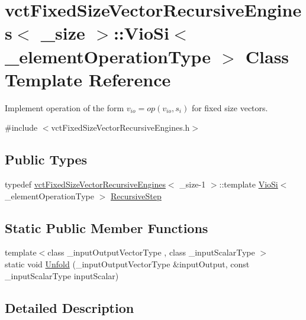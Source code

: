 \hypertarget{classvct_fixed_size_vector_recursive_engines_1_1_vio_si}{}\section{vct\+Fixed\+Size\+Vector\+Recursive\+Engines$<$ \+\_\+size $>$\+:\+:Vio\+Si$<$ \+\_\+element\+Operation\+Type $>$ Class Template Reference}
\label{classvct_fixed_size_vector_recursive_engines_1_1_vio_si}


Implement operation of the form $ v_{io} = op(v_{io}, s_i)$ for fixed size vectors.  




{\ttfamily \#include $<$vct\+Fixed\+Size\+Vector\+Recursive\+Engines.\+h$>$}

\subsection*{Public Types}
\begin{DoxyCompactItemize}
\item 
typedef \hyperlink{classvct_fixed_size_vector_recursive_engines}{vct\+Fixed\+Size\+Vector\+Recursive\+Engines}$<$ \+\_\+size-\/1 $>$\+::template \hyperlink{classvct_fixed_size_vector_recursive_engines_1_1_vio_si}{Vio\+Si}$<$ \+\_\+element\+Operation\+Type $>$ \hyperlink{classvct_fixed_size_vector_recursive_engines_1_1_vio_si_aa8b9d5743826725a5da54114f23fea1e}{Recursive\+Step}
\end{DoxyCompactItemize}
\subsection*{Static Public Member Functions}
\begin{DoxyCompactItemize}
\item 
{\footnotesize template$<$class \+\_\+input\+Output\+Vector\+Type , class \+\_\+input\+Scalar\+Type $>$ }\\static void \hyperlink{classvct_fixed_size_vector_recursive_engines_1_1_vio_si_a0c43157b7a2f159f481b0c3f33ecac9d}{Unfold} (\+\_\+input\+Output\+Vector\+Type \&input\+Output, const \+\_\+input\+Scalar\+Type input\+Scalar)
\end{DoxyCompactItemize}


\subsection{Detailed Description}
